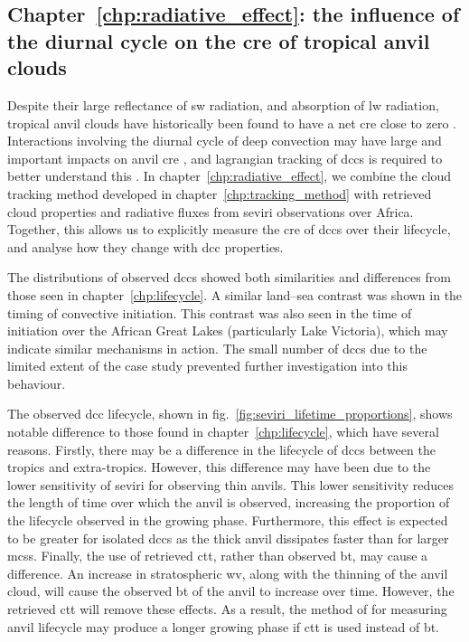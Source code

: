 \subsection{Chapter~\ref{chp:radiative_effect}: the influence of the diurnal cycle on the \acrshort{cre} of tropical anvil clouds}

Despite their large reflectance of \acrfull{sw} radiation, and absorption of \acrfull{lw} radiation, tropical anvil clouds have historically been found to have a net \acrfull{cre} close to zero \citep{ramanathan_cloud-radiative_1989, hartmann_effect_1992, hartmann_important_2002}. 
Interactions involving the diurnal cycle of deep convection may have large and important impacts on anvil \acrshort{cre} \citep{nowicki_observations_2004}, and lagrangian tracking of \acrshort{dcc}s is required to better understand this \citep{bouniol_macrophysical_2016}.
In chapter~\ref{chp:radiative_effect}, we combine the cloud tracking method developed in chapter~\ref{chp:tracking_method} with retrieved cloud properties and radiative fluxes from \acrshort{seviri} observations over Africa. 
Together, this allows us to explicitly measure the \acrshort{cre} of \acrshort{dcc}s over their lifecycle, and analyse how they change with \acrshort{dcc} properties.

The distributions of observed \acrshort{dcc}s showed both similarities and differences from those seen in chapter~\ref{chp:lifecycle}.
A similar land--sea contrast was shown in the timing of convective initiation.
This contrast was also seen in the time of initiation over the African Great Lakes (particularly Lake Victoria), which may indicate similar mechanisms in action.
The small number of \acrshort{dcc}s due to the limited extent of the case study prevented further investigation into this behaviour.

The observed \acrshort{dcc} lifecycle, shown in fig.~\ref{fig:seviri_lifetime_proportions}, shows notable difference to those found in chapter~\ref{chp:lifecycle}, which have several reasons.
Firstly, there may be a difference in the lifecycle of \acrshort{dcc}s between the tropics and extra-tropics.
However, this difference may have been due to the lower sensitivity of \acrshort{seviri} for observing thin anvils.
This lower sensitivity reduces the length of time over which the anvil is observed, increasing the proportion of the lifecycle observed in the growing phase.
Furthermore, this effect is expected to be greater for isolated \acrshort{dcc}s as the thick anvil dissipates faster than for larger \acrshort{mcs}s.
Finally, the use of retrieved \acrshort{ctt}, rather than observed \acrshort{bt}, may cause a difference.
An increase in stratospheric \acrshort{wv}, along with the thinning of the anvil cloud, will cause the observed \acrshort{bt} of the anvil to increase over time.
However, the retrieved \acrshort{ctt} will remove these effects.
As a result, the method of \citet{futyan_deep_2007} for measuring anvil lifecycle may produce a longer growing phase if \acrshort{ctt} is used instead of \acrshort{bt}.

